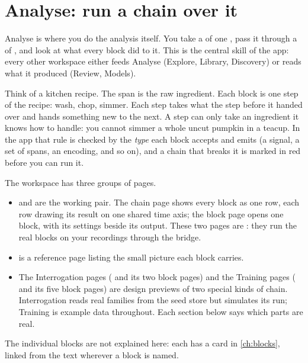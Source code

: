 \chapter{Analyse: run a chain over it}\label{ch:analyse}
Analyse is where you do the analysis itself. You take a  of one
, pass it through a  of , and look
at what every block did to it. This is the central skill of the app: every other workspace either
feeds Analyse (Explore, Library, Discovery) or reads what it produced (Review, Models).

\begin{plainterms}
Think of a kitchen recipe. The span is the raw ingredient. Each block is one step of the recipe:
wash, chop, simmer. Each step takes what the step before it handed over and hands something new to
the next. A step can only take an ingredient it knows how to handle: you cannot simmer a whole
uncut pumpkin in a teacup. In the app that rule is checked by the \emph{type} each block accepts
and emits (a signal, a set of spans, an encoding, and so on), and a chain that breaks it is marked
in red before you can run it.
\end{plainterms}

The workspace has three groups of pages.
\begin{itemize}
  \item {} and  are the working pair. The chain page
        shows every block as one row, each row drawing its result on one shared time axis; the
        block page opens one block, with its settings beside its output. These two pages are
        : they run the real blocks on your recordings through the bridge.
  \item {} is a reference page listing the small picture each block carries.
  \item The Interrogation pages ( and its two block pages) and the
        Training pages ( and its five block pages) are design previews of
        two special kinds of chain. Interrogation reads real families from the seed store but
        simulates its run; Training is example data throughout. Each section below says which
        parts are real.
\end{itemize}

The individual blocks are not explained here: each has a card in \cref{ch:blocks}, linked from
the text wherever a block is named.


